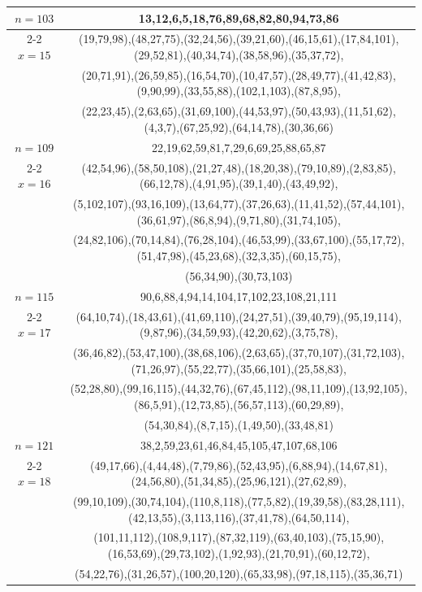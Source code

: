 \begin{tabular}{| c | c |}
\hline 
\(n=103\) & 
13,12,6,5,18,76,89,68,82,80,94,73,86\\
\cline{2-2}
\(x=15\)
&(19,79,98),(48,27,75),(32,24,56),(39,21,60),(46,15,61),(17,84,101),(29,52,81),(40,34,74),(38,58,96),(35,37,72),\\
&(20,71,91),(26,59,85),(16,54,70),(10,47,57),(28,49,77),(41,42,83),(9,90,99),(33,55,88),(102,1,103),(87,8,95),\\
&(22,23,45),(2,63,65),(31,69,100),(44,53,97),(50,43,93),(11,51,62),(4,3,7),(67,25,92),(64,14,78),(30,36,66)\\
\hline 
\(n=109\) & 
22,19,62,59,81,7,29,6,69,25,88,65,87\\
\cline{2-2}
\(x=16\)
&(42,54,96),(58,50,108),(21,27,48),(18,20,38),(79,10,89),(2,83,85),(66,12,78),(4,91,95),(39,1,40),(43,49,92),\\
&(5,102,107),(93,16,109),(13,64,77),(37,26,63),(11,41,52),(57,44,101),(36,61,97),(86,8,94),(9,71,80),(31,74,105),\\
&(24,82,106),(70,14,84),(76,28,104),(46,53,99),(33,67,100),(55,17,72),(51,47,98),(45,23,68),(32,3,35),(60,15,75),\\
&(56,34,90),(30,73,103)\\
\hline 
\(n=115\) & 
90,6,88,4,94,14,104,17,102,23,108,21,111\\
\cline{2-2}
\(x=17\)
&(64,10,74),(18,43,61),(41,69,110),(24,27,51),(39,40,79),(95,19,114),(9,87,96),(34,59,93),(42,20,62),(3,75,78),\\
&(36,46,82),(53,47,100),(38,68,106),(2,63,65),(37,70,107),(31,72,103),(71,26,97),(55,22,77),(35,66,101),(25,58,83),\\
&(52,28,80),(99,16,115),(44,32,76),(67,45,112),(98,11,109),(13,92,105),(86,5,91),(12,73,85),(56,57,113),(60,29,89),\\
&(54,30,84),(8,7,15),(1,49,50),(33,48,81)\\
\hline 
\(n=121\) & 
38,2,59,23,61,46,84,45,105,47,107,68,106\\
\cline{2-2}
\(x=18\)
&(49,17,66),(4,44,48),(7,79,86),(52,43,95),(6,88,94),(14,67,81),(24,56,80),(51,34,85),(25,96,121),(27,62,89),\\
&(99,10,109),(30,74,104),(110,8,118),(77,5,82),(19,39,58),(83,28,111),(42,13,55),(3,113,116),(37,41,78),(64,50,114),\\
&(101,11,112),(108,9,117),(87,32,119),(63,40,103),(75,15,90),(16,53,69),(29,73,102),(1,92,93),(21,70,91),(60,12,72),\\
&(54,22,76),(31,26,57),(100,20,120),(65,33,98),(97,18,115),(35,36,71)\\

\end{tabular}

